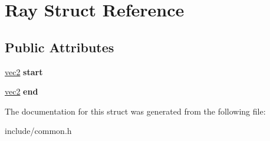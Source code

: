 \hypertarget{structRay}{}\section{Ray Struct Reference}
\label{structRay}
\subsection*{Public Attributes}
\begin{DoxyCompactItemize}
\item 
\hypertarget{structRay_a37cfe593762533d7fb094842172ce3eb}{}\hyperlink{structvec2}{vec2} {\bfseries start}\label{structRay_a37cfe593762533d7fb094842172ce3eb}

\item 
\hypertarget{structRay_a05ef34dc0c2a42ccfa6d54c8c00d00a7}{}\hyperlink{structvec2}{vec2} {\bfseries end}\label{structRay_a05ef34dc0c2a42ccfa6d54c8c00d00a7}

\end{DoxyCompactItemize}


The documentation for this struct was generated from the following file\+:\begin{DoxyCompactItemize}
\item 
include/common.\+h\end{DoxyCompactItemize}
